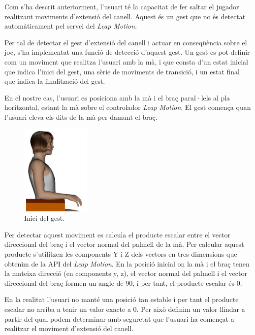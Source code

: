 \documentclass[12pt,a4paper,catalan]{article}
\begin{document}
	Com s'ha descrit anteriorment, l'usuari té la capacitat de fer saltar el jugador realitzant moviments d'extensió del canell. Aquest és un gest que no és detectat automàticament pel servei del \textit{Leap Motion}.
	
	Per tal de detectar el gest d'extensió del canell i actuar en conseqüència sobre el joc, s'ha implementat una funció de detecció d'aquest gest.
	Un gest es pot definir com un moviment que realitza l'usuari amb la mà, i que consta d'un estat inicial que indica l'inici del gest, una sèrie de moviments de transició, i un estat final que indica la finalització del gest.
	
	En el nostre cas, l'usuari es posiciona amb la mà i el braç paral·lels al pla horitzontal, estant la mà sobre el controlador \textit{Leap Motion}. El gest comença quan l'usuari eleva els dits de la mà per damunt el braç.
	\clearpage
	\begin{figure}
		\centering
		\includegraphics[width=0.3\textwidth]{hand-extension-init.png}
		\caption{Inici del gest.}
		\label{fig:hand-up-init}
	\end{figure}
	
	Per detectar aquest moviment es calcula el producte escalar entre el vector direccional del braç i el vector normal del palmell de la mà. Per calcular aquest producte s'utilitzen les components Y i Z dels vectors en tres dimensions que obtenim de la API del \textit{Leap Motion}.
	En la posició inicial on la mà i el braç tenen la mateixa direcció (en components y, z), el vector normal del palmell i el vector direccional del braç formen un angle de 90\textdegree, i per tant, el producte escalar és 0.
	
	En la realitat l'usuari no manté una posició tan estable i per tant el producte escalar no arriba a tenir un valor exacte a 0. Per això definim un valor llindar a partir del qual podem determinar amb seguretat que l'usuari ha començat a realitzar el moviment d'extensió del canell.
	
\end{document}
